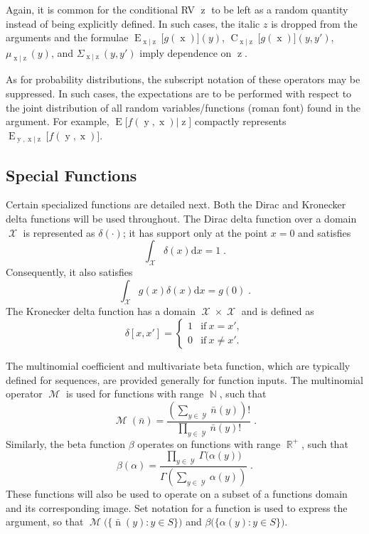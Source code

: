 \documentclass[12pt]{article}
\DeclareMathOperator{\xrm}{\mathrm{x}}
\DeclareMathOperator{\yrm}{\mathrm{y}}
\DeclareMathOperator{\nrm}{\mathrm{n}}
\DeclareMathOperator{\zrm}{\mathrm{z}}
\DeclareMathOperator{\Erm}{\mathrm{E}}
\DeclareMathOperator{\Crm}{\mathrm{C}}
\DeclareMathOperator{\Xcal}{\mathcal{X}}
\DeclareMathOperator{\Ycal}{\mathcal{Y}}
\DeclareMathOperator{\Mcal}{\mathcal{M}}
\DeclareMathOperator{\Rbb}{\mathbb{R}}
\DeclareMathOperator{\Nbb}{\mathbb{N}}
\begin{document}
Again, it is common for the conditional RV $\zrm$ to be left as a random quantity instead of being explicitly defined. In such cases, the italic $z$ is dropped from the arguments and the formulae $\Erm_{\xrm|\zrm}\big[ g(\xrm) \big](y)$, $\Crm_{\xrm|\zrm}\big[g(\xrm)\big](y,y')$, $\mu_{\xrm|\zrm}(y)$, and $\Sigma_{\xrm|\zrm}(y,y')$ imply dependence on $\zrm$.

As for probability distributions, the subscript notation of these operators may be suppressed. In such cases, the expectations are to be performed with respect to the joint distribution of all random variables/functions (roman font) found in the argument. For example, $\Erm\big[f(\yrm,\xrm) | \zrm \big]$ compactly represents $\Erm_{\yrm,\xrm | \zrm}\big[f(\yrm,\xrm)\big]$.


\subsection*{Special Functions}

Certain specialized functions are detailed next. Both the Dirac and Kronecker delta functions will be used throughout. The Dirac delta function over a domain $\Xcal$ is represented as $\delta(\cdot)$; it has support only at the point $x=0$ and satisfies
\begin{equation}
\int_{\Xcal} \delta(x) \mathrm{d}x = 1 \;.
\end{equation}
Consequently, it also satisfies
\begin{equation}
\int_{\Xcal} g(x) \delta(x) \mathrm{d}x = g(0) \;.
\end{equation}
The Kronecker delta function has a domain $\Xcal \times \Xcal$ and is defined as
\begin{equation}
\delta[x,x'] = \begin{cases} 1 & \mathrm{if} \ x = x', \\ 0 & \mathrm{if} \ x \neq x'.  \end{cases}
\end{equation}

The multinomial coefficient and multivariate beta function, which are typically defined for sequences, are provided generally for function inputs. The multinomial operator $\Mcal$ is used for functions with range $\Nbb$, such that 
\begin{equation}
\Mcal(\bar{n}) = \frac{\left( \sum_{y \in \Ycal} \bar{n}(y) \right)!}{\prod_{y \in \Ycal} \bar{n}(y)!} \;.
\end{equation}
Similarly, the beta function $\beta$ operates on functions with range $\Rbb^+$, such that
\begin{equation}
\beta(\alpha) = \frac{\prod_{y \in \Ycal} \Gamma\big( \alpha(y) \big)}{\Gamma \left( \sum_{y \in \Ycal} \alpha(y) \right)} \;.
\end{equation}
These functions will also be used to operate on a subset of a functions domain and its corresponding image. Set notation for a function is used to express the argument, so that $\Mcal\Big( \big\{ \bar{\nrm}(y) : y \in S \big\} \Big)$ and $\beta\Big( \big\{ \alpha(y) : y \in S \big\} \Big)$.
\end{document}
